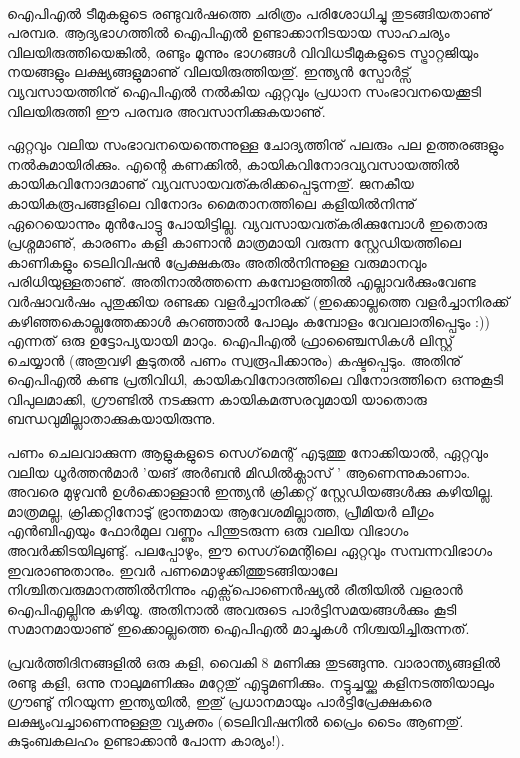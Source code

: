﻿
\enlargethispage{3\baselineskip}
\vskip 2pt

‌\hspace*{3em}\parbox{8.5cm}{
\small
ഐപിഎല്‍ ടീമുകളുടെ രണ്ടുവര്‍ഷത്തെ ചരിത്രം പരിശോധിച്ചു തുടങ്ങിയതാണു് പരമ്പര. ആദ്യഭാഗത്തില്‍ ഐപിഎല്‍ 
ഉണ്ടാക്കാനിടയായ സാഹചര്യം വിലയിരുത്തിയെങ്കില്‍, രണ്ടും മൂന്നും ഭാഗങ്ങള്‍ വിവിധടീമുകളുടെ സ്ട്രാറ്റജിയും നയങ്ങളും 
ലക്ഷ്യങ്ങളുമാണു് വിലയിരുത്തിയതു്. ഇന്ത്യന്‍ സ്പോര്‍ട്സ് വ്യവസായത്തിനു് ഐപിഎല്‍ നല്‍കിയ ഏറ്റവും 
പ്രധാന സംഭാവനയെക്കൂടി വിലയിരുത്തി ഈ പരമ്പര അവസാനിക്കുകയാണു്.
}

\vskip 12pt
\hspace*{-1.5em}ഏറ്റവും വലിയ സംഭാവനയെന്തെന്നുള്ള ചോദ്യത്തിനു് പലരും പല ഉത്തരങ്ങളും നല്‍കുമായിരിക്കും. എന്റെ കണക്കില്‍, 
കായികവിനോദവ്യവസായത്തില്‍ കായികവിനോദമാണു് വ്യവസായവത്കരിക്കപ്പെടുന്നതു്. ജനകീയ കായികരൂപങ്ങളിലെ 
വിനോദം മൈതാനത്തിലെ കളിയില്‍നിന്നു് ഏറെയൊന്നും മുന്‍പോട്ടു പോയിട്ടില്ല. വ്യവസായവത്കരിക്കുമ്പോള്‍ ഇതൊരു 
പ്രശ്നമാണു്, കാരണം കളി കാണാന്‍ മാത്രമായി വരുന്ന സ്റ്റേഡിയത്തിലെ കാണികളും ടെലിവിഷന്‍ പ്രേക്ഷകരും അതില്‍നിന്നുള്ള വരുമാനവും പരിധിയുള്ളതാണു്. അതിനാല്‍ത്തന്നെ കമ്പോളത്തില്‍ എല്ലാവര്‍ക്കുംവേണ്ട വര്‍ഷാവര്‍ഷം പുതുക്കിയ രണ്ടക്ക വളര്‍ച്ചാനിരക്ക് 
(ഇക്കൊല്ലത്തെ വളര്‍ച്ചാനിരക്ക് കഴിഞ്ഞകൊല്ലത്തേക്കാള്‍ കുറഞ്ഞാല്‍ പോലും കമ്പോളം 
വേവലാതിപ്പെടും :)) എന്നത് ഒരു ഉട്ടോപ്യയായി മാറും. ഐപിഎല്‍ ഫ്രാഞ്ചൈസികള്‍ ലിസ്റ്റ് ചെയ്യാന്‍ (അതുവഴി കൂടുതല്‍ 
പണം സ്വരൂപിക്കാനും) കഷ്ടപ്പെടും. അതിനു് ഐപിഎല്‍ കണ്ട പ്രതിവിധി, കായികവിനോദത്തിലെ വിനോദത്തിനെ ഒന്നുകൂടി വിപുലമാക്കി, ഗ്രൗണ്ടില്‍ നടക്കുന്ന കായികമത്സരവുമായി യാതൊരു ബന്ധവുമില്ലാതാക്കുകയായിരുന്നു.

പണം ചെലവാക്കുന്ന ആളുകളുടെ സെഗ്‌മെന്റ് എടുത്തു നോക്കിയാല്‍, ഏറ്റവും വലിയ ധൂര്‍ത്തന്‍മാര്‍ 'യങ് അര്‍ബന്‍ 
മിഡില്‍ക്ലാസ് ' ആണെന്നുകാണാം. അവരെ മുഴുവന്‍ ഉള്‍ക്കൊള്ളാന്‍ ഇന്ത്യന്‍ ക്രിക്കറ്റ് സ്റ്റേഡിയങ്ങള്‍ക്കു കഴിയില്ല. മാത്രമല്ല, 
ക്രിക്കറ്റിനോടു് ഭ്രാന്തമായ ആവേശമില്ലാത്ത, പ്രീമിയര്‍ ലീഗും എന്‍ബിഎയും ഫോര്‍മുല വണ്ണും പിന്തുടരുന്ന ഒരു വലിയ വിഭാഗം 
അവര്‍ക്കിടയിലുണ്ടു്. പലപ്പോഴും, ഈ സെഗ്‌മെന്റിലെ ഏറ്റവും സമ്പന്നവിഭാഗം ഇവരാണുതാനും. ഇവര്‍ 
പണമൊഴുക്കിത്തുടങ്ങിയാലേ നിശ്ചിതവരുമാനത്തില്‍നിന്നും എക്സ്‌പൊണെന്‍ഷ്യല്‍ രീതിയില്‍ വളരാന്‍ ഐപിഎല്ലിനു 
കഴിയൂ. അതിനാല്‍ അവരുടെ പാര്‍ട്ടിസമയങ്ങള്‍ക്കും കൂടി സമാനമായാണു് ഇക്കൊല്ലത്തെ ഐപിഎല്‍ മാച്ചുകള്‍ 
നിശ്ചയിച്ചിരുന്നത്.


പ്രവര്‍ത്തിദിനങ്ങളില്‍ ഒരു കളി, വൈകി 8 മണിക്കു തുടങ്ങുന്നു. വാരാന്ത്യങ്ങളില്‍ രണ്ടു കളി, ഒന്നു നാലുമണിക്കും മറ്റേതു് 
എട്ടുമണിക്കും. നട്ടുച്ചയ്ക്കു കളിനടത്തിയാലും ഗ്രൗണ്ടു് നിറയുന്ന ഇന്ത്യയില്‍, ഇതു് പ്രധാനമായും പാര്‍ട്ടിപ്രേക്ഷകരെ ലക്ഷ്യംവച്ചാണെന്നുള്ളതു 
വ്യക്തം (ടെലിവിഷനില്‍ പ്രൈം ടൈം ആണതു്. കുടുംബകലഹം ഉണ്ടാക്കാന്‍ പോന്ന കാര്യം!).

